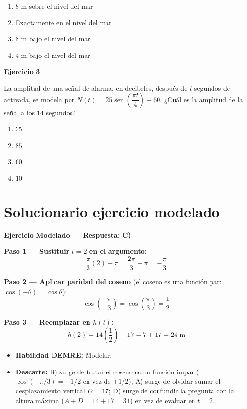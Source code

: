 \documentclass[12pt,letterpaper]{article}
\providecommand{\sen}{\operatorname{sen}}
\begin{document}
\begin{enumerate}[label=\Alph*)]
    \item $8\text{ m}$ sobre el nivel del mar
    \item Exactamente en el nivel del mar
    \item $8\text{ m}$ bajo el nivel del mar
    \item $4\text{ m}$ bajo el nivel del mar
\end{enumerate}

\vspace{3.5cm}


\textbf{Ejercicio 3}

La amplitud de una señal de alarma, en decibeles, después de $t$ segundos de activada, se modela por $N(t)=25\sen\left(\dfrac{\pi t}{4}\right)+60$. ¿Cuál es la amplitud de la señal a los $14$ segundos?

\begin{enumerate}[label=\Alph*)]
    \item $35$
    \item $85$
    \item $60$
    \item $10$
\end{enumerate}

\vspace{3.5cm}
\newpage

\section{Solucionario ejercicio modelado}

\textbf{Ejercicio Modelado --- Respuesta: C)}

\textbf{Paso 1 --- Sustituir $t=2$ en el argumento:}
\[ \frac{\pi}{3}(2)-\pi = \frac{2\pi}{3}-\pi = -\frac{\pi}{3} \]

\textbf{Paso 2 --- Aplicar paridad del coseno} (el coseno es una función par: $\cos(-\theta)=\cos\theta$):
\[ \cos\left(-\frac{\pi}{3}\right) = \cos\left(\frac{\pi}{3}\right) = \frac{1}{2} \]

\textbf{Paso 3 --- Reemplazar en $h(t)$:}
\[ h(2) = 14\left(\frac{1}{2}\right)+17 = 7+17 = 24\text{ m} \]

\begin{itemize}[leftmargin=*]
    \item \textbf{Habilidad DEMRE:} Modelar.
    \item \textbf{Descarte:} B) surge de tratar el coseno como función impar ($\cos(-\pi/3)=-1/2$ en vez de $+1/2$); A) surge de olvidar sumar el desplazamiento vertical $D=17$; D) surge de confundir la pregunta con la altura máxima ($A+D=14+17=31$) en vez de evaluar en $t=2$.
\end{itemize}
\end{document}
